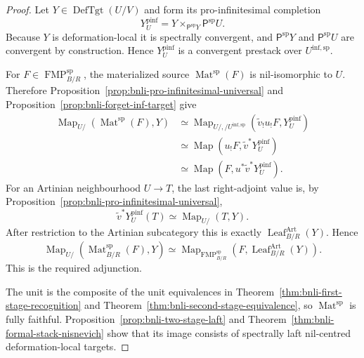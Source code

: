 \begin{proof}
Let $Y\in\operatorname{DefTgt}(U/V)$ and form its pro-infinitesimal
completion
\[
    Y_U^{\mathrm{pinf}}
    =
    Y\times_{\mathsf P^{\mathrm{sp}}Y}
    \mathsf P^{\mathrm{sp}}U.
\]
Because $Y$ is deformation-local it is spectrally convergent, and
$\mathsf P^{\mathrm{sp}}Y$ and $\mathsf P^{\mathrm{sp}}U$ are convergent by
construction.  Hence $Y_U^{\mathrm{pinf}}$ is a convergent prestack over
$U^{\mathrm{inf,sp}}$.

For $F\in\operatorname{FMP}^{\mathrm{sp}}_{B/R}$, the materialized source
$\operatorname{Mat}^{\mathrm{sp}}(F)$ is nil-isomorphic to $U$.  Therefore
Proposition~\ref{prop:bnli-pro-infinitesimal-universal} and
Proposition~\ref{prop:bnli-forget-inf-target} give
\[
\begin{aligned}
\operatorname{Map}_{U/}
\left(
  \operatorname{Mat}^{\mathrm{sp}}(F),Y
\right)
&\simeq
\operatorname{Map}_{U/,/U^{\mathrm{inf,sp}}}
\left(
  \widetilde v_!u_!F,
  Y_U^{\mathrm{pinf}}
\right)\\
&\simeq
\operatorname{Map}
\left(
  u_!F,
  \widetilde v^*Y_U^{\mathrm{pinf}}
\right)\\
&\simeq
\operatorname{Map}
\left(
  F,
  u^*\widetilde v^*Y_U^{\mathrm{pinf}}
\right).
\end{aligned}
\]
For an Artinian neighbourhood $U\to T$, the last right-adjoint value is,
by Proposition~\ref{prop:bnli-pro-infinitesimal-universal},
\[
    \widetilde v^*Y_U^{\mathrm{pinf}}(T)
    \simeq
    \operatorname{Map}_{U/}(T,Y).
\]
After restriction to the Artinian subcategory this is exactly
$\operatorname{Leaf}^{\mathrm{Art}}_{B/R}(Y)$.  Hence
\[
\boxed{
\operatorname{Map}_{U/}
\left(
  \operatorname{Mat}^{\mathrm{sp}}_{B/R}(F),Y
\right)
\simeq
\operatorname{Map}_{\operatorname{FMP}^{\mathrm{sp}}_{B/R}}
\left(
  F,
  \operatorname{Leaf}^{\mathrm{Art}}_{B/R}(Y)
\right).}
\]
This is the required adjunction.

The unit is the composite of the unit equivalences in
Theorem~\ref{thm:bnli-first-stage-recognition} and
Theorem~\ref{thm:bnli-second-stage-equivalence}, so
$\operatorname{Mat}^{\mathrm{sp}}$ is fully faithful.
Proposition~\ref{prop:bnli-two-stage-laft} and
Theorem~\ref{thm:bnli-formal-stack-nisnevich} show that its image consists of
spectrally laft nil-centred deformation-local targets.


\end{proof}
